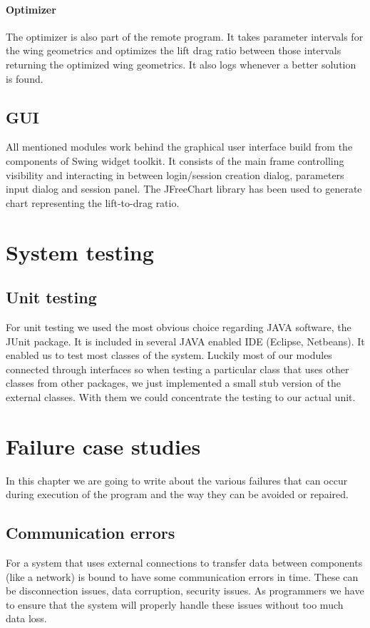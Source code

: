 \documentclass[10pt,a4paper]{report}
\begin{document}
\subsubsection{Optimizer}
The optimizer is also part of the remote program. It takes parameter intervals for the wing geometrics and optimizes the lift drag ratio between those intervals returning the optimized wing geometrics. It also logs whenever a better solution is found.

\section{GUI}
All mentioned modules work behind the graphical user interface build from the components of Swing widget toolkit. It consists of the main frame controlling visibility and interacting in between login/session creation dialog, parameters input dialog and session panel. The JFreeChart library \citep{WWW:JFreeChart} has been used to generate chart representing the lift-to-drag ratio.

\chapter{System testing}
\label{ch:test}
\section{Unit testing}
For unit testing we used the most obvious choice regarding JAVA software, the JUnit package. It is included in several JAVA enabled IDE (Eclipse, Netbeans). It enabled us to test most classes of the system. Luckily most of our modules connected through interfaces so when testing a particular class that uses other classes from other packages, we just implemented a small stub version of the external classes. With them we could concentrate the testing to our actual unit.

\chapter{Failure case studies}
\label{ch:fail}
In this chapter we are going to write about the various failures that can occur during execution of the program and the way they can be avoided or repaired.

\section{Communication errors}
For a system that uses external connections to transfer data between components (like a network) is bound to have some communication errors in time. These can be disconnection issues, data corruption, security issues. As programmers we have to ensure that the system will properly handle these issues without too much data loss.
\end{document}
